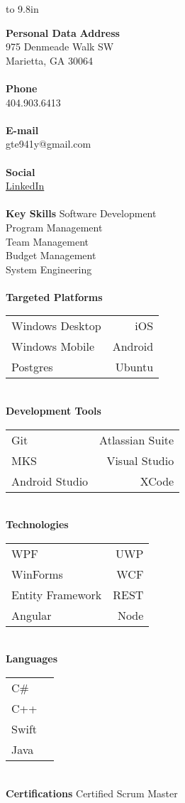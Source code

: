 \documentclass[paper=a4,fontsize=11pt]{article}
\newcommand{\filledmarker}{\raisebox{0.5pt}{\tikz{\node[draw,scale=0.6,circle,fill=black](){};}}}
\newcommand{\unfilledmarker}{\raisebox{0.5pt}{\tikz{\node[draw,scale=0.6,circle,fill=none](){};}}}
\newcommand{\beginnerscale}{
	\filledmarker\hspace{.1mm}
	\unfilledmarker\hspace{.1mm}
	\unfilledmarker\hspace{.1mm}
	\unfilledmarker\hspace{.1mm}
	\unfilledmarker
}
\newcommand{\beginnerprofscale}{
	\filledmarker\hspace{.1mm}
	\filledmarker\hspace{.1mm}
	\unfilledmarker\hspace{.1mm}
	\unfilledmarker\hspace{.1mm}
	\unfilledmarker
}
\newcommand{\proficientscale}{
	\filledmarker\hspace{.1mm}
	\filledmarker\hspace{.1mm}
	\filledmarker\hspace{.1mm}
	\unfilledmarker\hspace{.1mm}
	\unfilledmarker
}
\newcommand{\profexpertscale}{
	\filledmarker\hspace{.1mm}
	\filledmarker\hspace{.1mm}
	\filledmarker\hspace{.1mm}
	\filledmarker\hspace{.1mm}
	\unfilledmarker
}
\newcommand{\expertscale}{
	\filledmarker\hspace{.1mm}
	\filledmarker\hspace{.1mm}
	\filledmarker\hspace{.1mm}
	\filledmarker\hspace{.1mm}
	\filledmarker
}
\newcommand{\PersonalData}[4]{
	\textbf{Personal Data}
	\myrule[1pt][5pt]
	\textbf{Address}\\
	#1\\
	#2\\
	\\[1pt]
	\textbf{Phone}\\
	#3\\
	\\[1pt]
	\textbf{E-mail}\\
	#4\\
	\\[1pt]
	\textbf{Social}\\
	\href{https://www.linkedin.com/in/justinrfox}{LinkedIn}\\
	\\[6pt]
}
\newcommand{\KeySkills}[5]{
	\textbf{Key Skills}
	\myrule[1pt][5pt]
	\small #1\\
	\small #2\\
	\small #3\\
	\small #4\\
	\small #5\\
	\\[6pt]
}
\newcommand{\Platforms}[6]{
	\textbf{Targeted Platforms}
	\myrule[1pt][5pt]
	\begin{tabular}{ l r }
	\small #1 &
	\small #2\\
	\small #3 &
	\small #4\\
	\small #5 &
	\small #6\\
	\end{tabular}
	\\[6pt]
}
\newcommand{\TechnicalSkills}[8]{
	\textbf{Technologies}
	\myrule[1pt][5pt]
	\begin{tabular}{ l r }
  		\small #1 & \small #2 \\
 		\small #3 & \small #4 \\
  		\small #5 & \small #6 \\
		\small #7 & \small #8 \\
	\end{tabular}
	\\[6pt]
}
\newcommand{\Languages}[8]{
	\textbf{Languages}
	\myrule[1pt][5pt]
	\begin{tabular}{ l r }
	\small #1 &
	\small #2\\
	\small #3 &
	\small #4\\
	\small #5 &
	\small #6\\
	\small #7 &
	\small #8\\
	\end{tabular}
	\\[6pt]
}
\newcommand{\DeveloperTools}[6]{
	\textbf{Development Tools}
	\myrule[1pt][5pt]
	\begin{tabular}{ l r }
	\small #1 &
	\small #2\\
	\small #3 &
	\small #4\\
	\small #5 &
	\small #6\\
	\end{tabular}
	\\[6pt]
}
\newcommand{\Certifications}[1]{
	\textbf{Certifications}
	\myrule[1pt][5pt]
	#1
	\\[6pt]
}
\begin{document}
\hfill
\begin{minipage}[t]{0.25\linewidth}
	\colorbox{myLightGray}{
	\vbox to 9.8in{
			\PersonalData{975 Denmeade Walk SW}{Marietta, GA 30064}{404.903.6413}{gte941y@gmail.com}
			\KeySkills{Software Development}{Program Management}{Team Management}{Budget Management}{System Engineering}
			\Platforms{Windows Desktop}{iOS}{Windows Mobile}{Android}{Postgres}{Ubuntu}
			\DeveloperTools{Git}{Atlassian Suite}{MKS}{Visual Studio}{Android Studio}{XCode}
			\TechnicalSkills{WPF}{UWP}{WinForms}{WCF}{Entity Framework}{REST}{Angular}{Node}
			\Languages{C\#}{\expertscale}{C++}{\proficientscale}{Swift}{\profexpertscale}{Java}{\proficientscale}%
			\Certifications{Certified Scrum Master}
			\vfill
		}
	}
\end{minipage}%
\end{document}
